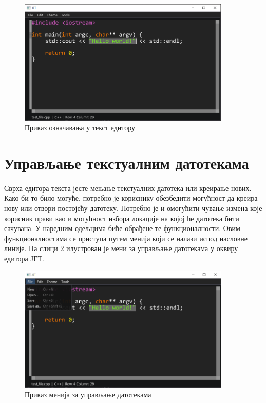 \documentclass[12pt,oneside]{memoir}
\begin{document}
\begin{figure}[!ht]
	\centering
	\includegraphics[width=0.9\textwidth]{images/selection.png}
	\caption{Приказ означавања у текст едитору}
	\label{fig:selection}
\end{figure}

\section{Управљање текстуалним датотекама}
\paragraph{}
Сврха едитора текста јесте мењање текстуалних датотека или креирање нових. 
Како би то било могуће, потребно је кориснику обезбедити могућност да креира нову или 
отвори постојећу датотеку. Потребно је и омогућити чување измена које корисник
прави као и могућност избора локације на којој ће датотека бити сачувана. У наредним 
одељцима биће обрађене те функционалности. Овим функционалностима се приступа путем
менија који се налази испод насловне линије. На слици \ref{fig:file_menu} илустрован је мени за управљање датотекама у оквиру едитора ЈЕТ.

\begin{figure}[!ht]
	\centering
	\includegraphics[width=0.9\textwidth]{images/file_menu.png}
	\caption{Приказ менија за управљање датотекама}
	\label{fig:file_menu}
\end{figure}
\end{document}
